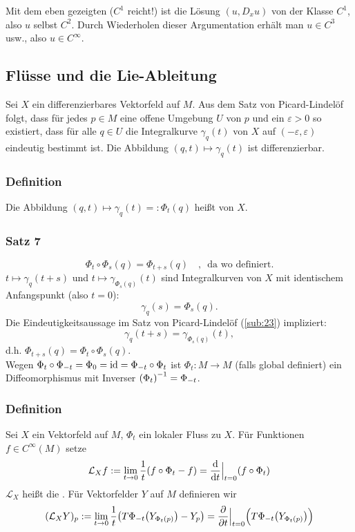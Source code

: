 Mit dem eben gezeigten ($C^1$ reicht!) ist die Lösung $(u, D_x u)$ von der Klasse $C^1$, also $u$ selbst $C^2$. Durch Wiederholen dieser Argumentation erhält man
$u \in C^3$ usw., also $u \in C^\infty$. \bewende
\newpage

\subsection{Flüsse und die Lie-Ableitung} %
\label{sub:24}
Sei $X$ ein differenzierbares Vektorfeld auf $M$. Aus dem Satz von Picard-Lindelöf folgt, dass für jedes $p \in M$ eine offene Umgebung $U$ von $p$ und ein $\varepsilon>0$
so existiert, dass für alle $q \in U$ die Integralkurve $\gamma_q(t)$ von $X$ auf $({-\varepsilon}, \varepsilon)$ eindeutig bestimmt ist. Die Abbildung 
$(q,t) \mapsto \gamma_q(t)$ ist differenzierbar.

\subsubsection[Definition: lokaler Fluss]{Definition} %
\label{ssub:241}
Die Abbildung $(q,t) \mapsto \gamma_q(t) =: \Phi_t(q)$ heißt  von $X$. 

\subsubsection[Satz 7: Verkettung von lokalen Flüssen]{Satz 7} %
\label{ssub:242}
\[
	\Phi_t \circ \Phi_s(q) = \Phi_{t+s}(q)\quad , \enspace \text{da wo definiert.}
\]
$t \mapsto \gamma_q(t+s)$ und $t \mapsto \gamma_{\Phi_s(q)}(t)$ sind Integralkurven von $X$ mit identischem Anfangspunkt (also $t=0$): 
\[
	\gamma_q(s) = \Phi_s(q). 
\]
Die Eindeutigkeitsaussage im Satz von Picard-Lindelöf (\ref{sub:23}) impliziert:
\[
	\gamma_q(t +s) = \gamma_{\Phi_s(q)}(t),
\]
d.h. $\Phi_{t+s}(q) = \Phi_t \circ \Phi_s (q)$. \bewende \bigskip\\
Wegen $\Phi_t \circ \Phi_{-t} = \Phi_0 = \id = \Phi_{-t} \circ \Phi_t$ ist $\Phi_t : M \to M$ (falls global definiert) ein Diffeomorphismus mit Inverser
\(
	 \enbrace*{\Phi_t} ^{-1} = \Phi_{-t} 
\).

\subsubsection[Definition: Lie-Ableitung]{Definition} %
\label{ssub:243}
Sei $X$ ein Vektorfeld auf $M$, $\Phi_t$ ein lokaler Fluss zu $X$. Für Funktionen $f \in C^\infty(M)$ setze
\[
	\mathcal{L} _X f := \lim_{ t \to 0} \frac{1}{t} \enbrace*{f \circ  \Phi_t - f} = \diffd{}{t}\Big|_{t=0} (f \circ \Phi_t)    
\]
$\mathcal{L} _X$ heißt die . 
Für Vektorfelder $Y$ auf $M$ definieren wir
\[
	(\mathcal{L}_X Y)_p := \lim_{ t \to 0} \frac{1}{t} \enbrace[\big]{T \Phi_{-t} \enbrace*{Y_{\Phi_t(p)}} - Y_p} = \diff{}{t}\Big|_{t=0} \enbrace[\Big]{T \Phi_{-t} 
	\enbrace*{Y_{\Phi _t(p)}} }     
\]

